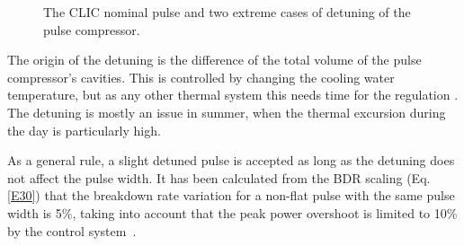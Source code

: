  
\begin{figure}[h]
\centering
{}
\hspace{2mm}
\caption{The CLIC nominal pulse and two extreme cases of detuning of the pulse compressor.}
\label{detuning_fig}
\end{figure}
 



The origin of the detuning is the difference of the total volume of the pulse compressor's cavities. This is controlled by changing the cooling water temperature, but as any other thermal system this needs time for the regulation \cite{Woolley:CWS2016}. The detuning is mostly an issue in summer, when the thermal excursion during the day is particularly high.

As a general rule, a slight detuned pulse is accepted as long as the detuning does not affect the pulse width. It has been calculated from the BDR scaling (Eq. \ref{E30}) that the breakdown rate variation for a non-flat pulse with the same pulse width is 5\%, taking into account that the peak power overshoot is limited to 10\% by the control system~\cite{Frank:PC}.  

